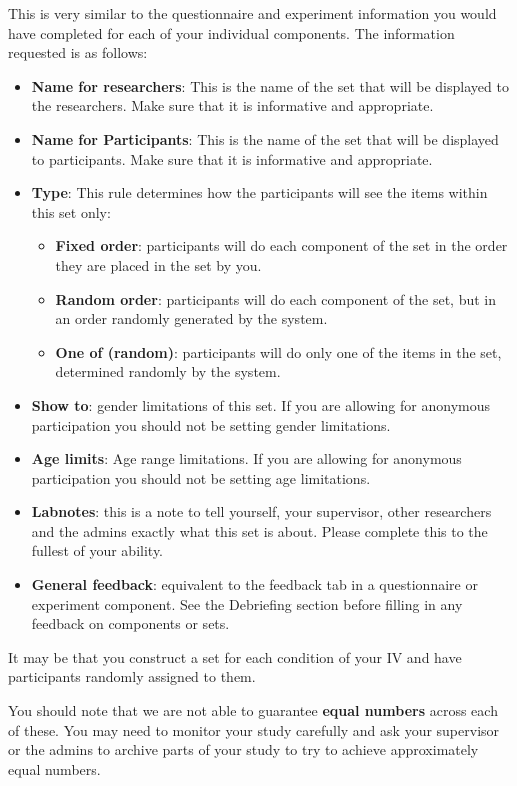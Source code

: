 \documentclass[]{book}
\providecommand{\tightlist}{%
  \setlength{\itemsep}{0pt}\setlength{\parskip}{0pt}}
\begin{document}
This is very similar to the questionnaire and experiment information you
would have completed for each of your individual components. The
information requested is as follows:

\begin{itemize}
\tightlist
\item
  \textbf{Name for researchers}: This is the name of the set that will
  be displayed to the researchers. Make sure that it is informative and
  appropriate.
\item
  \textbf{Name for Participants}: This is the name of the set that will
  be displayed to participants. Make sure that it is informative and
  appropriate.
\item
  \textbf{Type}: This rule determines how the participants will see the
  items within this set only:

  \begin{itemize}
  \tightlist
  \item
    \textbf{Fixed order}: participants will do each component of the set
    in the order they are placed in the set by you.
  \item
    \textbf{Random order}: participants will do each component of the
    set, but in an order randomly generated by the system.
  \item
    \textbf{One of (random)}: participants will do only one of the items
    in the set, determined randomly by the system.
  \end{itemize}
\item
  \textbf{Show to}: gender limitations of this set. If you are allowing
  for anonymous participation you should not be setting gender
  limitations.
\item
  \textbf{Age limits}: Age range limitations. If you are allowing for
  anonymous participation you should not be setting age limitations.
\item
  \textbf{Labnotes}: this is a note to tell yourself, your supervisor,
  other researchers and the admins exactly what this set is about.
  Please complete this to the fullest of your ability.
\item
  \textbf{General feedback}: equivalent to the feedback tab in a
  questionnaire or experiment component. See the Debriefing section
  before filling in any feedback on components or sets.
\end{itemize}

\begin{info}
It may be that you construct a set for each condition of your IV and
have participants randomly assigned to them.

You should note that we are not able to guarantee \textbf{equal numbers}
across each of these. You may need to monitor your study carefully and
ask your supervisor or the admins to archive parts of your study to try
to achieve approximately equal numbers.
\end{info}
\end{document}
